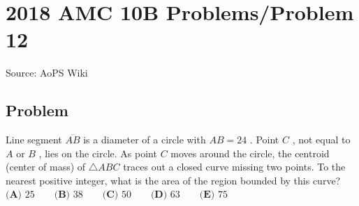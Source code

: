 \documentclass[12pt]{article}
\begin{document}
\section*{{2018 AMC 10B Problems/Problem 12}}
Source: AoPS Wiki

\subsection*{Problem}
Line segment $\overline{AB}$ is a diameter of a circle with $AB = 24$ . Point $C$ , not equal to $A$ or $B$ , lies on the circle. As point $C$ moves around the circle, the centroid (center of mass) of $\triangle ABC$ traces out a closed curve missing two points. To the nearest positive integer, what is the area of the region bounded by this curve? $\textbf{(A) } 25 \qquad \textbf{(B) } 38 \qquad \textbf{(C) } 50 \qquad \textbf{(D) } 63 \qquad \textbf{(E) } 75$
\end{document}
